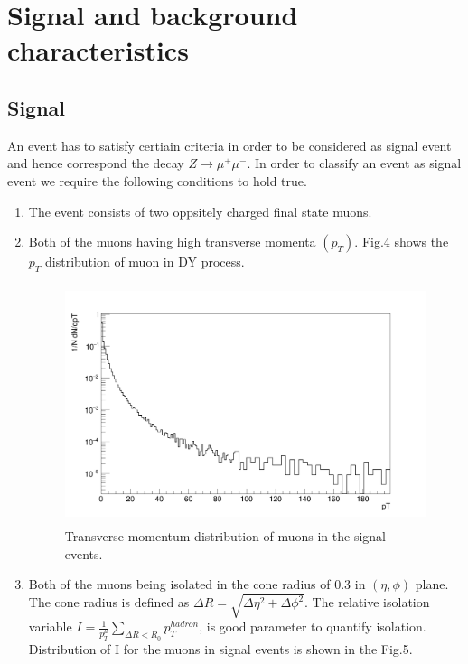 \documentclass{article}		%
\begin{document}
\newpage



\section{Signal and background characteristics}
		
 
 
\subsection{Signal}
				An event has to satisfy certiain criteria in order to be considered  as signal event and hence correspond the decay  $Z \to \mu^+\mu^-$. In order to classify an event as signal event we require the following conditions to hold true.   
				\begin{enumerate}
					\item The event consists of two oppsitely charged final state muons.
					\item Both of the muons having high transverse momenta $(p_T)$. Fig.4 shows the $p_T$ distribution of muon in DY process.
						
					\begin{figure}[h]
						\centering	
						\includegraphics[width=130mm,height=70mm]{h.png} 
						\caption{Transverse momentum distribution of muons in the signal events.}						
					\end{figure}
					
					
					\item Both of the muons being isolated in the cone radius of 0.3 in $(\eta,\phi)$ plane. The cone radius is defined as $\Delta R = \sqrt{\Delta \eta^2 + \Delta \phi^2}$. The relative isolation variable  $I = \frac{1}{p_T^{\mu}}\sum_{\Delta R< R_0 }^{} p_T^{hadron}$, is good parameter to quantify isolation. Distribution of I for the muons in signal events is shown in the Fig.5.
					

\end{enumerate}
\end{document}
